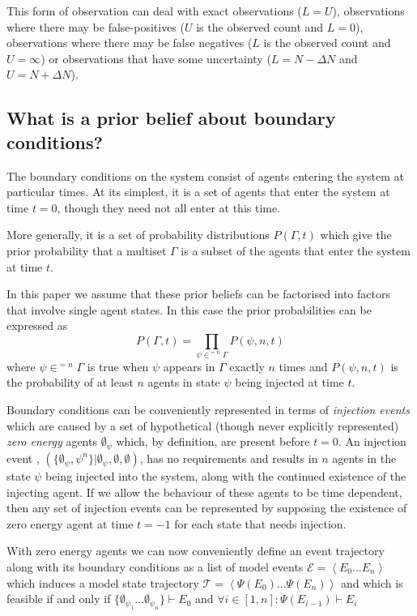 \documentclass{article}
\begin{document}
This form of observation can deal with exact observations ($L=U$), observations where there may be false-positives ($U$ is the observed count and $L=0$), observations where there may be false negatives ($L$ is the observed count and $U=\infty$) or observations that have some uncertainty ($L = N - \Delta N$ and $U = N + \Delta N$).
 
\subsection{What is a prior belief about boundary conditions?}

The boundary conditions on the system consist of agents entering the system at particular times. At its simplest, it is a set of agents that enter the system at time $t=0$, though they need not all enter at this time.

More generally, it is a set of probability distributions $P(\Gamma,t)$ which give the prior probability that a multiset $\Gamma$ is a subset of the agents that enter the system at time $t$.

In this paper we assume that these prior beliefs can be factorised into factors that involve single agent states. In this case the prior probabilities can be expressed as
\[
P(\Gamma,t) = \prod_{\psi \in^{=n} \Gamma} P(\psi,n,t)
\]
where $\psi\in^{=n}\Gamma$ is true when $\psi$ appears in $\Gamma$ exactly $n$ times and $P(\psi,n,t)$ is the probability of at least $n$ agents in state $\psi$ being injected at time $t$. 

Boundary conditions can be conveniently represented in terms of \textit{injection events} which are caused by a set of hypothetical (though never explicitly represented) \textit{zero energy} agents $\emptyset_\psi$ which, by definition, are present before $t=0$. An injection event , $(\{\emptyset_\psi, \psi^n\}|\emptyset_\psi,\emptyset,\emptyset)$, has no requirements and results in $n$ agents in the state $\psi$ being injected into the system, along with the continued existence of the injecting agent. If we allow the behaviour of these agents to be time dependent, then any set of injection events can be represented by supposing the existence of zero energy agent at time $t=-1$ for each state that needs injection.

With zero energy agents we can now conveniently define an event trajectory along with its boundary conditions as a list of model events $\mathcal{E} = \left<E_0...E_n\right>$ which induces a model state trajectory $\mathcal{T} = \left<\Psi(E_0)...\Psi(E_n)\right>$ and which is feasible if and only if $\{\emptyset_{\psi_1}...\emptyset_{\psi_n}\} \vdash E_0$ and  $\forall i \in [1,n]: \Psi(E_{i-1}) \vdash E_i$
\end{document}
